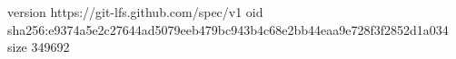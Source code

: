 version https://git-lfs.github.com/spec/v1
oid sha256:e9374a5e2c27644ad5079eeb479bc943b4c68e2bb44eaa9e728f3f2852d1a034
size 349692
